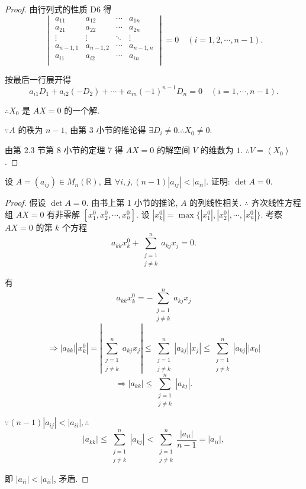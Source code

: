 \documentclass{ctexart}
\begin{document}
\begin{proof}
    由行列式的性质 D6 得
    \[\begin{vmatrix}
        a_{11} & a_{12} & \cdots & a_{1n} \\
        a_{21} & a_{22} & \cdots & a_{2n} \\
        \vdots & \vdots & \ddots & \vdots \\
        a_{n-1,1} & a_{n-1,2} & \cdots & a_{n-1,n} \\
        a_{i1} & a_{i2} & \cdots & a_{in} \\
    \end{vmatrix}=0\quad(i=1,2,\cdots,n-1).\]

    按最后一行展开得
    \[a_{i1}D_1+a_{i2}(-D_2)+\cdots+a_{in}(-1)^{n-1}D_n=0\quad(i=1,\cdots,n-1).\]

    $\therefore X_0$ 是 $AX=0$ 的一个解.

    $\because A$ 的秩为 $n-1$, 由第 3 小节的推论得 $\exists D_i\neq0.\therefore X_0\neq0$.

    由第 2.3 节第 8 小节的定理 7 得 $AX=0$ 的解空间 $V$ 的维数为 $1$. $\therefore V=\left<X_0\right>$.
\end{proof}
\begin{exercise}[3.5]
    设 $A=(a_{ij})\in M_n(\mathbb{R})$, 且 $\forall i,j,(n-1)|a_{ij}|<|a_{ii}|$. 证明: $\det A=0$.
\end{exercise}
\begin{proof}
    假设 $\det A=0$. 由书上第 1 小节的推论, $A$ 的列线性相关. $\therefore$ 齐次线性方程组 $AX=0$ 有非零解 $[x^0_1,x^0_2,\cdots,x^0_n]$. 设 $|x^0_k|=\max\{|x^0_1|,|x^0_2|,\cdots,|x^0_n|\}$. 考察 $AX=0$ 的第 $k$ 个方程
    \[a_{kk}x^0_k+\sum_{\substack{j=1\\j\neq k}}^na_{kj}x_j=0.\]

    有
    \[a_{kk}x^0_k=-\sum_{\substack{j=1\\j\neq k}}^na_{kj}x_j\]
    \[\Rightarrow|a_{kk}||x^0_k|=\left|\sum_{\substack{j=1\\j\neq k}}^na_{kj}x_j\right|\leq\sum_{\substack{j=1\\j\neq k}}^n|a_{kj}||x_j|\leq\sum_{\substack{j=1\\j\neq k}}^n|a_{kj}||x_0|\]
    \[\Rightarrow|a_{kk}|\leq\sum_{\substack{j=1\\j\neq k}}^n|a_{kj}|.\]

    $\because(n-1)|a_{ij}|<|a_{ii}|,\therefore$
    \[|a_{kk}|\leq\sum_{\substack{j=1\\j\neq k}}^n|a_{kj}|<\sum_{\substack{j=1\\j\neq k}}^n\dfrac{|a_{ii}|}{n-1}=|a_{ii}|,\]

    即 $|a_{ii}|<|a_{ii}|$, 矛盾.
\end{proof}
\end{document}
